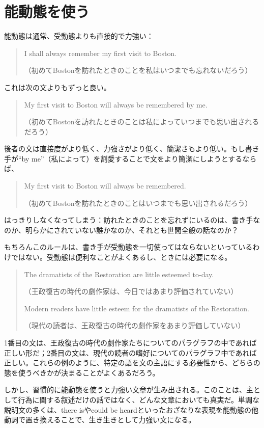 \section{能動態を使う}
能動態は通常、受動態よりも直接的で力強い：
\begin{quote}
I shall always remember my first visit to Boston.

（初めてBostonを訪れたときのことを私はいつまでも忘れないだろう）
\end{quote}
これは次の文よりもずっと良い。
\begin{quote}
My first visit to Boston will always be remembered by me.

（初めてBostonを訪れたときのことは私によっていつまでも思い出されるだろう）
\end{quote}
後者の文は直接度がより低く、力強さがより低く、簡潔さもより低い。もし書き手が``by
me''（私によって）を割愛することで文をより簡潔にしようとするならば、
\begin{quote}
My first visit to Boston will always be remembered.

（初めてBostonを訪れたときのことはいつまでも思い出されるだろう）
\end{quote}
はっきりしなくなってしまう：訪れたときのことを忘れずにいるのは、書き手なのか、明らかにされていない誰かなのか、それとも世間全般の話なのか？
\par
もちろんこのルールは、書き手が受動態を一切使ってはならないといっているわけではない。受動態は便利なことがよくあるし、ときには必要になる。
\begin{quote}
    The dramatists of the Restoration are little esteemed to-day.
    
    （王政復古の時代の劇作家は、今日ではあまり評価されていない）
    
    Modern readers have little esteem for the dramatists of the
Restoration.

（現代の読者は、王政復古の時代の劇作家をあまり評価していない）
\end{quote}
1番目の文は、王政復古の時代の劇作家たちについてのパラグラフの中であれば正しい形だ；2番目の文は、現代の読者の嗜好についてのパラグラフ中であれば正しい。これらの例のように、特定の語を文の主語にする必要性から、どちらの態を使うべきかが決まることがよくあるだろう。
\par
しかし、習慣的に能動態を使うと力強い文章が生み出される。このことは、主として行為に関する叙述だけの話ではなく、どんな文章においても真実だ。単調な説明文の多くは、there isやcould be heardといったおざなりな表現を能動態の他動詞で置き換えることで、生き生きとして力強い文になる。
